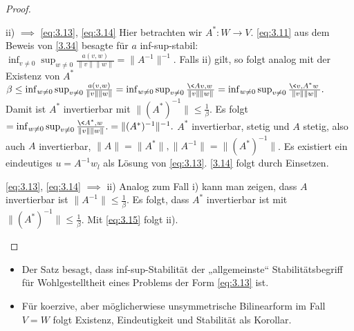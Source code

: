 \begin{st}
\begin{proof}
\begin{seg}{ii) $\implies$ \eqref{eq:3.13}, \eqref{eq:3.14}}
			Hier betrachten wir $A^*: W \to V$.
			\eqref{eq:3.11} aus dem Beweis von \ref{3.34} besagte für $a$ inf-sup-stabil:
			\begin{math}
				\inf_{v\neq 0} \sup_{w\neq 0} \frac{a(v,w)}{\|v\|\|w\|}
				= \|A^{-1}\|^{-1}.
			\end{math}
			Falls ii) gilt, so folgt analog mit der Existenz von $A^*$
			\begin{math}
				\beta \le \inf_{w\neq 0} \sup_{v\neq 0} \frac{a(v,w)}{\|v\|\|w\|}
				= \inf_{w\neq 0} \sup_{v\neq 0}  \frac{\<Av, w\>}{\|v\|\|w\|}
				= \inf_{w\neq 0} \sup_{v\neq 0}  \frac{\<v, A^*w\>}{\|v\|\|w\|}.
			\end{math}
			Damit ist $A^*$ invertierbar mit $\|(A^*)^{-1}\| \le \frac{1}{\beta}$.
			Es folgt
			\begin{math}[numbered] \label{eq:3.15}
				= \inf_{w\neq 0} \sup_{v\neq 0}  \frac{\<A^*,w\>}{\|v\|\|w\|}.
				= \|(A^*)^{-1}\|^{-1}.
			\end{math}
			$A^*$ invertierbar, stetig und $A$ stetig, also auch $A$ invertierbar, $\|A\| = \|A^*\|, \|A^{-1}\| = \|(A^*)^{-1}\|$.
			Es existiert ein eindeutiges $u = A^{-1} w_l$ als Lösung von \eqref{eq:3.13}.
			\eqref{3.14} folgt durch Einsetzen.
		\end{seg}
		\begin{seg}{\eqref{eq:3.13}, \eqref{eq:3.14} $\implies$ ii)}
			Analog zum Fall i) kann man zeigen, dass $A$ invertierbar ist $\|A^{-1}\| \le \frac{1}{\beta}$.
			Es folgt, dass $A^*$ invertierbar ist mit $\|(A^*)^{-1}\| \le \frac{1}{\beta}$.
			Mit \eqref{eq:3.15} folgt ii).
		\end{seg}
	\end{proof}
	\begin{note}
		\begin{itemize}
			\item
				Der Satz besagt, dass inf-sup-Stabilität der „allgemeinste“ Stabilitätsbegriff für Wohlgestelltheit eines Problems der Form \eqref{eq:3.13} ist.
			\item
				Für koerzive, aber möglicherwiese unsymmetrische Bilinearform im Fall $V = W$ folgt Existenz, Eindeutigkeit und Stabilität als Korollar.
		\end{itemize}
	\end{note}
\end{st}

